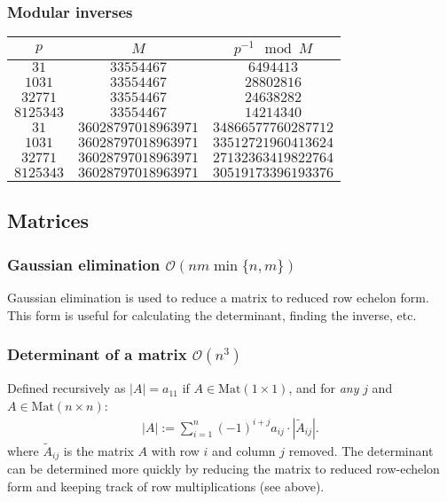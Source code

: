 \subsubsection{Modular inverses}
\begin{table}[H]
    \centering
    \begin{tabular}{|c|c|c|}
        \hline
        $p$ & $M$ & $p^{-1} \mod M$ \\
        \hline
        $31$ & $33554467$ & $6494413$ \\
        $1031$ & $33554467$ & $28802816$ \\
        $32771$ & $33554467$ & $24638282$ \\
        $8125343$ & $33554467$ & $14214340$ \\
        $31$ & $36028797018963971$ & $34866577760287712$ \\
        $1031$ & $36028797018963971$ & $33512721960413624$ \\
        $32771$ & $36028797018963971$ & $27132363419822764$ \\
        $8125343$ & $36028797018963971$ & $30519173396193376$ \\
        \hline
    \end{tabular}
    \label{tab:modinv}
\end{table}



\subsection{Matrices}

\subsubsection{Gaussian elimination $\mathcal O(nm\min\{n,m\})$}
Gaussian elimination is used to reduce a matrix to reduced row echelon form. This form is useful for calculating the determinant, finding the inverse, etc.

\subsubsection{Determinant of a matrix $\mathcal{O}(n^3)$}
Defined recursively as $|A| = a_{11}$ if $A \in \text{Mat}(1 \times 1)$, and
for \textit{any} $j$ and $A \in \text{Mat}(n \times n)$:
\begin{align*}
    |A| := \sum_{i=1}^n (-1)^{i+j} a_{ij} \cdot |\tilde A_{ij}|.
\end{align*}
where $\tilde A_{ij}$ is the matrix $A$ with row $i$ and column $j$ removed. The determinant can be determined more quickly by reducing the matrix to reduced row-echelon form and keeping track of row multiplications (see above).

